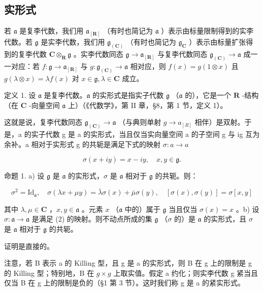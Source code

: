 \subsection{实形式}

若 \(\mathfrak{a}\) 是复李代数，我们用 \(\mathfrak{a}_{[\mathbf{R} ]}\) （有时也简记为 \(\mathfrak{a}\) ）表示由标量限制得到的实李代数。若 \(\mathfrak{g}\) 是实李代数，我们用 \(\mathfrak{g}_{(\mathbf{C})}\) （有时也简记为 \(\mathfrak{g}_{\mathbf{C}}\) ）表示由标量扩张得到的复李代数 \(\mathbf{C}\otimes_{\mathbf{R}}\mathfrak{g}\) 。实李代数同态 \(\mathfrak{g}\to \mathfrak{a}_{[\mathbf{R}]}\) 与复李代数同态 \(\mathfrak{g}_{(\mathbf{C})}\to \mathfrak{a}\) 成一一对应：若 \(f:\mathfrak{g}\to \mathfrak{a}_{[\mathbf{R}]}\) 与 \(g:\mathfrak{g}_{(\mathbf{C})}\to \mathfrak{a}\) 相对应，则 \(f(x) = g(1\otimes x)\) 且 \(g(\lambda \otimes x) = \lambda f(x)\) 对 \(x\in \mathfrak{g},\lambda \in \mathbf{C}\) 成立。

定义 1. 设 \(\mathfrak{a}\) 是复李代数。\(\mathfrak{a}\) 的实形式是指实子代数 \(\mathfrak{g}\) （\(\mathfrak{a}\) 的），它是一个 \(\mathbf{R}\) -结构（在 \(\mathbf{C}\) -向量空间 \(\mathfrak{a}\) 上）（《代数学》，第 II 章，§8，第 1 节，定义 1）。

这就是说，复李代数同态 \(\mathfrak{g}_{(\mathbf{C})}\to\mathfrak{a}\) （与典则单射 \(g\to a_{[R]}\) 相伴）是双射。于是，a 的实子代数 g 是 a 的实形式，当且仅当实向量空间 a 的子空间 g 与 ig 互为余补。a 相对于实形式 g 的共轭是满足下式的映射 \(\sigma:a\to a\)

\[
\sigma (x + i y) = x - i y, \quad x, y \in \mathfrak {g}.\tag{1}
\]

命题 1. a) 设 \(\mathfrak{g}\) 是 \(\mathfrak{a}\) 的实形式，\(\sigma\) 是 \(\mathfrak{a}\) 相对于 \(\mathfrak{g}\) 的共轭。则：

\[
\sigma^ {2} = \mathrm{Id} _ {\mathfrak {a}}, \quad \sigma (\lambda x + \mu y) = \bar {\lambda} \sigma (x) + \bar {\mu} \sigma (y), \quad [ \sigma (x), \sigma (y) ] = \sigma [ x, y ]\tag{2}
\]

其中 \(\lambda, \mu \in \mathbf{C}\) ，\(x, y \in \mathfrak{a}\) 。元素 \(x\) （\(\mathfrak{a}\) 中的）属于 \(\mathfrak{g}\) 当且仅当 \(\sigma(x) = x\) 。b) 设 \(\sigma: \mathfrak{a} \to \mathfrak{a}\) 是满足 (2) 的映射。则不动点所成的集 \(\mathfrak{g}\) （\(\sigma\) 的）是 \(\mathfrak{a}\) 的实形式，且 \(\sigma\) 是 \(\mathfrak{a}\) 相对于 \(\mathfrak{g}\) 的共轭。

证明是直接的。

注意，若 B 表示 a 的 Killing 型，且 g 是 a 的实形式，则 B 在 g 上的限制是 g 的 Killing 型；特别地，B 在 \(g \times g\) 上取实值。假定 a 约化；则实李代数 g 紧当且仅当 B 在 g 上的限制是负的（§1 第 3 节）。这时我们称 g 是 a 的紧实形式。

